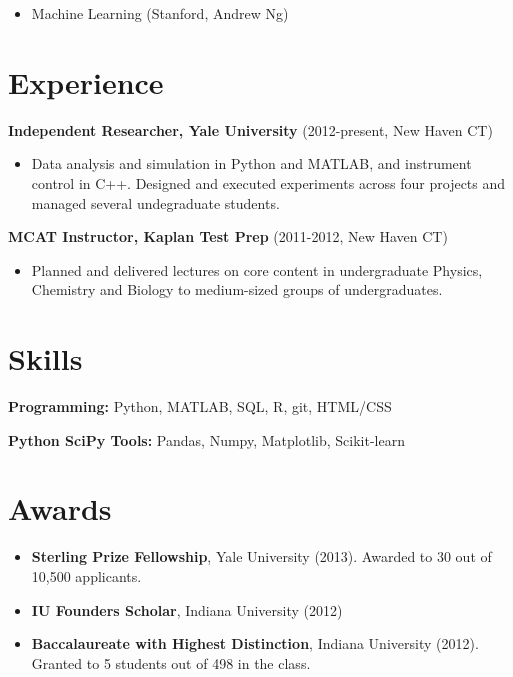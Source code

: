 \documentclass[
]{report}
\providecommand{\tightlist}{%
  \setlength{\itemsep}{0pt}\setlength{\parskip}{0pt}}\usepackage{longtable,booktabs,array}
\begin{document}
\begin{itemize}
\tightlist
\item
  Machine Learning (Stanford, Andrew Ng)
\end{itemize}

\hypertarget{experience}{%
\chapter{Experience}\label{experience}}

\textbf{Independent Researcher, Yale University} (2012-present, New
Haven CT)

\begin{itemize}
\tightlist
\item
  Data analysis and simulation in Python and MATLAB, and instrument
  control in C++. Designed and executed experiments across four projects
  and managed several undegraduate students.
\end{itemize}

\textbf{MCAT Instructor, Kaplan Test Prep} (2011-2012, New Haven CT)

\begin{itemize}
\tightlist
\item
  Planned and delivered lectures on core content in undergraduate
  Physics, Chemistry and Biology to medium-sized groups of
  undergraduates.
\end{itemize}

\hypertarget{skills}{%
\chapter{Skills}\label{skills}}

\textbf{Programming:} Python, MATLAB, SQL, R, git, HTML/CSS

\textbf{Python SciPy Tools:} Pandas, Numpy, Matplotlib, Scikit-learn

\hypertarget{awards}{%
\chapter{Awards}\label{awards}}

\begin{itemize}
\tightlist
\item
  \textbf{Sterling Prize Fellowship}, Yale University (2013). Awarded to
  30 out of 10,500 applicants.
\item
  \textbf{IU Founders Scholar}, Indiana University (2012)
\item
  \textbf{Baccalaureate with Highest Distinction}, Indiana University
  (2012). Granted to 5 students out of 498 in the class.
\end{itemize}
\end{document}
